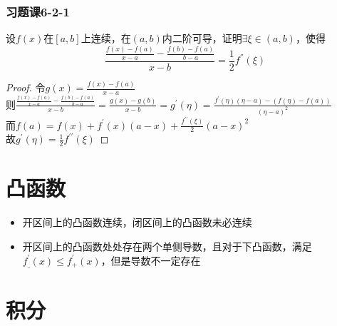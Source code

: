 \documentclass[./main.tex]{subfiles}
\begin{document}
\subsubsection{习题课6-2-1}
\noindent 设$f(x)$在$[a,b]$上连续，在$(a,b)$内二阶可导，证明$\exists\xi\in(a,b)$，使得
\begin{equation*}
\frac{\frac{f(x)-f(a)}{x-a}-\frac{f(b)-f(a)}{b-a}}{x-b}=\frac{1}{2}f^{''}(\xi)
\end{equation*}
\begin{proof}
  令$g(x)=\frac{f(x)-f(a)}{x-a}$\\
  \indent 则$\frac{\frac{f(x)-f(a)}{x-a}-\frac{f(b)-f(a)}{b-a}}{x-b}=\frac{g(x)-g(b)}{x-b}=g^{\prime}(\eta)=\frac{f^{\prime}(\eta)(\eta-a)-(f(\eta)-f(a))}{(\eta-a)^2}$\\
  \indent 而$f(a)=f(x)+f^{\prime}(x)(a-x)+\frac{f^{\prime\prime}(\xi)}{2}(a-x)^2$\\
  \indent 故$g^{\prime}(\eta)=\frac{1}{2}f^{\prime\prime}(\xi)$
\end{proof}
\section{凸函数}
\begin{itemize}
  \item 开区间上的凸函数连续，闭区间上的凸函数未必连续
  \item 开区间上的凸函数处处存在两个单侧导数，且对于下凸函数，满足$f_{\_}^{\prime}(x)\le f_{+}^{\prime}(x)$，但是导数不一定存在
\end{itemize}
\section{积分}
\end{document}
